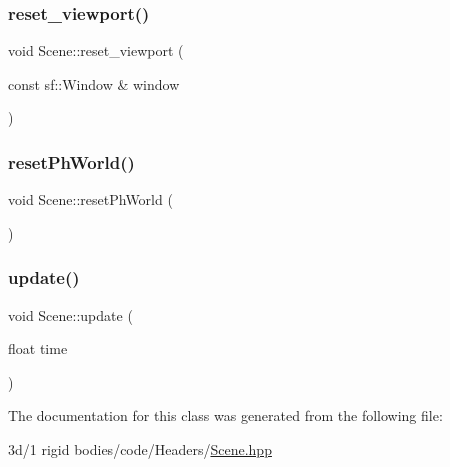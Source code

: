 \subsubsection{\texorpdfstring{reset\+\_\+viewport()}{reset\_viewport()}}
{\footnotesize\ttfamily void Scene\+::reset\+\_\+viewport (\begin{DoxyParamCaption}\item[{const sf\+::\+Window \&}]{window }\end{DoxyParamCaption})}

\mbox{\label{class_scene_aca095a03977e82f8c5a76cf4d3752c96}} 
\subsubsection{\texorpdfstring{reset\+Ph\+World()}{resetPhWorld()}}
{\footnotesize\ttfamily void Scene\+::reset\+Ph\+World (\begin{DoxyParamCaption}{ }\end{DoxyParamCaption})\hspace{0.3cm}{\ttfamily [inline]}}

\mbox{\label{class_scene_a846a5af36bafc63922980b72cd6abf96}} 
\subsubsection{\texorpdfstring{update()}{update()}}
{\footnotesize\ttfamily void Scene\+::update (\begin{DoxyParamCaption}\item[{float}]{time }\end{DoxyParamCaption})}



The documentation for this class was generated from the following file\+:\begin{DoxyCompactItemize}
\item 
3d/1 rigid bodies/code/\+Headers/\mbox{\hyperlink{_scene_8hpp}{Scene.\+hpp}}\end{DoxyCompactItemize}

